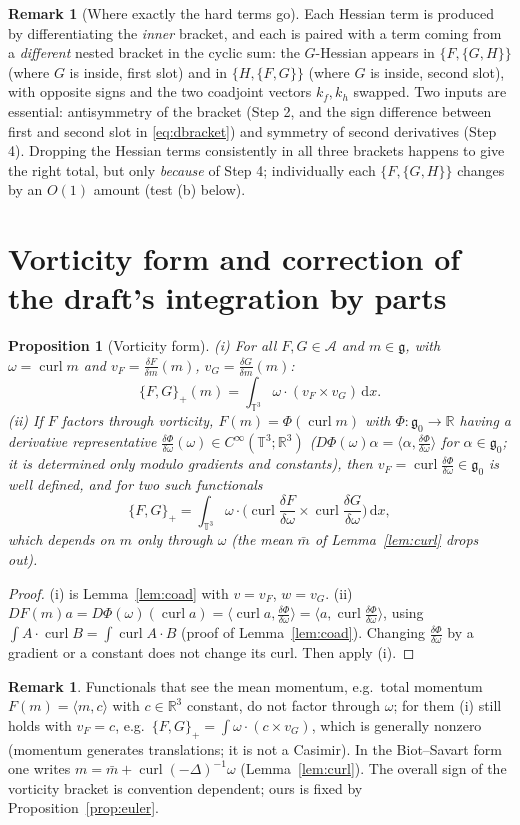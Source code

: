 \documentclass[11pt]{article}
\newtheorem{proposition}[theorem]{Proposition}
\theoremstyle{definition}
\newtheorem{remark}[theorem]{Remark}
\newcommand{\T}{\mathbb{T}^3}
\newcommand{\R}{\mathbb{R}}
\newcommand{\g}{\mathfrak{g}}
\newcommand{\ip}[2]{\langle #1,#2\rangle}
\newcommand{\dd}{\,\mathrm{d}x}
\newcommand{\curl}{\operatorname{curl}}
\newcommand{\dF}[1]{\frac{\delta #1}{\delta m}}
\begin{document}
\begin{remark}[Where exactly the hard terms go]
Each Hessian term is produced by differentiating the \emph{inner} bracket, and each is paired with
a term coming from a \emph{different} nested bracket in the cyclic sum: the $G$-Hessian appears in
$\{F,\{G,H\}\}$ (where $G$ is inside, first slot) and in $\{H,\{F,G\}\}$ (where $G$ is inside, second
slot), with opposite signs and the two coadjoint vectors $k_f,k_h$ swapped. Two inputs are
essential: antisymmetry of the bracket (Step 2, and the sign difference between first and second
slot in \eqref{eq:dbracket}) and symmetry of second derivatives (Step 4). Dropping the Hessian terms
consistently in all three brackets happens to give the right total, but only \emph{because} of Step 4;
individually each $\{F,\{G,H\}\}$ changes by an $O(1)$ amount (test (b) below).
\end{remark}

\section{Vorticity form and correction of the draft's integration by parts}\label{sec:vorticity}
\begin{proposition}[Vorticity form]\label{prop:vort}
(i) For all $F,G\in\mathcal A$ and $m\in\g$, with $\omega=\curl m$ and $v_F=\dF F(m)$, $v_G=\dF G(m)$:
\[
\{F,G\}_+(m)=\int_{\T}\omega\cdot(v_F\times v_G)\dd .
\]
(ii) If $F$ factors through vorticity, $F(m)=\Phi(\curl m)$ with $\Phi:\g_0\to\R$ having a derivative
representative $\frac{\delta\Phi}{\delta\omega}(\omega)\in C^\infty(\T;\R^3)$
($D\Phi(\omega)\alpha=\ip\alpha{\frac{\delta\Phi}{\delta\omega}}$ for $\alpha\in\g_0$; it is determined only
modulo gradients and constants), then $v_F=\curl\frac{\delta\Phi}{\delta\omega}\in\g_0$ is well defined,
and for two such functionals
\[
\{F,G\}_+=\int_{\T}\omega\cdot\Big(\curl\frac{\delta F}{\delta\omega}\times\curl\frac{\delta G}{\delta\omega}\Big)\dd ,
\]
which depends on $m$ only through $\omega$ (the mean $\bar m$ of Lemma~\ref{lem:curl} drops out).
\end{proposition}
\begin{proof}
(i) is Lemma~\ref{lem:coad} with $v=v_F$, $w=v_G$. (ii) $DF(m)a=D\Phi(\omega)(\curl a)=\ip{\curl a}{\frac{\delta\Phi}{\delta\omega}}=\ip a{\curl\frac{\delta\Phi}{\delta\omega}}$,
using $\int A\cdot\curl B=\int\curl A\cdot B$ (proof of Lemma~\ref{lem:coad}). Changing
$\frac{\delta\Phi}{\delta\omega}$ by a gradient or a constant does not change its curl. Then apply (i).
\end{proof}
\begin{remark}
Functionals that see the mean momentum, e.g.\ total momentum $F(m)=\ip mc$ with $c\in\R^3$ constant,
do not factor through $\omega$; for them (i) still holds with $v_F=c$, e.g.\ $\{F,G\}_+=\int\omega\cdot(c\times v_G)$,
which is generally nonzero (momentum generates translations; it is not a Casimir). In the Biot--Savart
form one writes $m=\bar m+\curl(-\Delta)^{-1}\omega$ (Lemma~\ref{lem:curl}). The overall sign of the
vorticity bracket is convention dependent; ours is fixed by Proposition~\ref{prop:euler}.
\end{remark}
\end{document}
